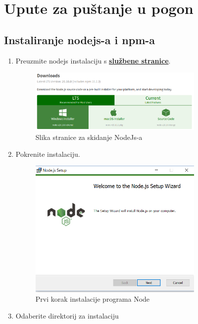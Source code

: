 			\eject 
		
		\section{Upute za puštanje u pogon}
		
		\subsection*{Instaliranje nodejs-a i npm-a}
		\begin{enumerate}
			\item Preuzmite nodejs instalaciju s \textbf{\href{https://nodejs.org/en/download/}{službene stranice}}.
			\begin{figure}[h]
				\centering
				\includegraphics[width=0.8\textwidth]{slike/npm_install/0.png}
				\caption{Slika stranice za skidanje NodeJs-a}
				\label{fig:node_install_images}
			\end{figure}
			\item Pokrenite instalaciju.
			\begin{figure}[h]
				\centering
				\includegraphics[width=0.8\textwidth]{slike/npm_install/1.png}
				\caption{Prvi korak instalacije programa Node}
				\label{fig:node_install_images}
			\end{figure}
			\eject
			\item Odaberite direktorij za instalaciju

\end{enumerate}
